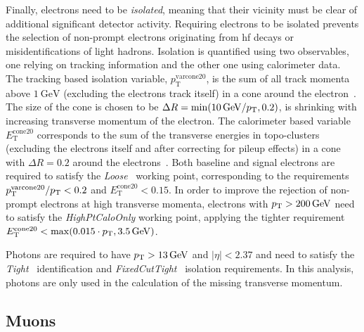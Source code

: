 Finally, electrons need to be \textit{isolated}, meaning that their vicinity must be clear of additional significant detector activity.
Requiring electrons to be isolated prevents the selection of non-prompt electrons originating from \eg \gls{hf} decays or misidentifications of light hadrons.
Isolation is quantified using two observables, one relying on tracking information and the other one using calorimeter data. The tracking based isolation variable, $p_{\mathrm{T}}^{\mathrm{varcone20}}$, is the sum of all track momenta above $\SI{1}{\GeV}$ (excluding the electrons track itself) in a cone around the electron~\cite{EGAM-2018-01}.
The size of the cone is chosen to be $\Delta R = \min (\SI{10}{\GeV}/\pt,0.2)$, \ie is shrinking with increasing transverse momentum of the electron.
The calorimeter based variable $E_{\mathrm{T}}^{\mathrm{cone20}}$ corresponds to the sum of the transverse energies in topo-clusters (excluding the electrons itself and after correcting for pileup effects) in a cone with $\Delta R = 0.2$ around the electrons~\cite{EGAM-2018-01}.
Both baseline and signal electrons are required to satisfy the \textit{Loose}~\cite{EGAM-2018-01} working point, corresponding to the requirements $p_{\mathrm{T}}^{\mathrm{varcone20}}/p_{\textrm{T}} < 0.2$ and $E_{\mathrm{T}}^{\mathrm{cone20}} < 0.15$.
In order to improve the rejection of non-prompt electrons at high transverse momenta, electrons with $\pt >\SI{200}{\GeV}$ need to satisfy the \textit{HighPtCaloOnly} working point, applying the tighter requirement $E_{\mathrm{T}}^{\mathrm{cone20}} < \max (0.015\cdot\pt,\SI{3.5}{\GeV})$. 

Photons are required to have $p_{\textrm{T}} > \SI{13}{GeV}$ and $\vert\eta\vert<2.37$ and need to satisfy the \textit{Tight}~\cite{EGAM-2018-01} identification and \textit{FixedCutTight}~\cite{EGAM-2018-01} isolation requirements.
In this analysis, photons are only used in the calculation of the missing transverse momentum.

\subsection{Muons}

